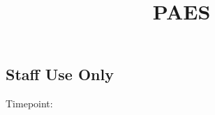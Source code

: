 \documentclass[
  14pt,
  english,
  a4paper,
  sdaps_style=code128,
  checkmode=check,
  print_questionnaire_id
]{sdapsclassic}
\title{PAES}
\author{}
\date{}
\begin{document}
\begin{questionnaire}[noinfo]


\section{Staff Use Only}

    \noindent
    \begin{minipage}[t]{0.48\linewidth}
    \end{minipage}\hfill
    \begin{minipage}[t]{0.48\linewidth}
    \end{minipage}

    \noindent
    \begin{minipage}[c]{3cm}
        Timepoint:
    \end{minipage}%
    \begin{minipage}[c]{\dimexpr\linewidth-1cm\relax}
        \begin{optionquestion}[cols=4, var=timepoint]{}
        \end{optionquestion}
    \end{minipage}


\end{questionnaire}
\end{document}
